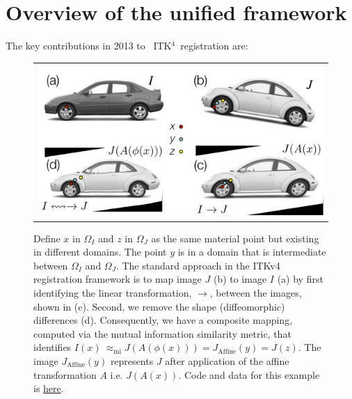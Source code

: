 \documentclass{frontiersSCNS}
\newcommand{\tk}{~ITK$^{\text{4}}$~}
\begin{document}
\section{Overview of the unified framework}
The key contributions in 2013 to \tk registration are:
\begin{figure}[t]
\begin{center}
\begin{tabular}{c}
\includegraphics[width=6in]{figs/RegistrationNomenclature.pdf}
\end{tabular}
\caption{\baselineskip 12pt \small Define $x$ in $\Omega_I$ and $z$ in
  $\Omega_J$ as the same material point but existing in different
  domains.  The point $y$ is in a domain that is intermediate between
  $\Omega_I$ and $\Omega_J$.  The standard approach in the ITKv4
  registration framework is to map image $J$ (b) to image $I$ (a) by first
  identifying the linear transformation, $\rightarrow$, between the images, shown in (c).  Second, we remove the shape (diffeomorphic)
  differences (d).  Consequently, we have a composite mapping, computed via the
  mutual information similarity metric, that identifies
  $I(x) ~\approx_\text{mi}  J(A(\phi(x))) =  J_\text{Affine}(y) = J(z)
  $. The image $J_\text{Affine}(y)$
  represents $J$ after application of the affine transformation $A$
  i.e. $J(A(x))$.  Code and data for this example is \href{http://stnava.github.io/cars/}{here}.}
\label{fig:composite}
\end{center}
\end{figure}
\end{document}
